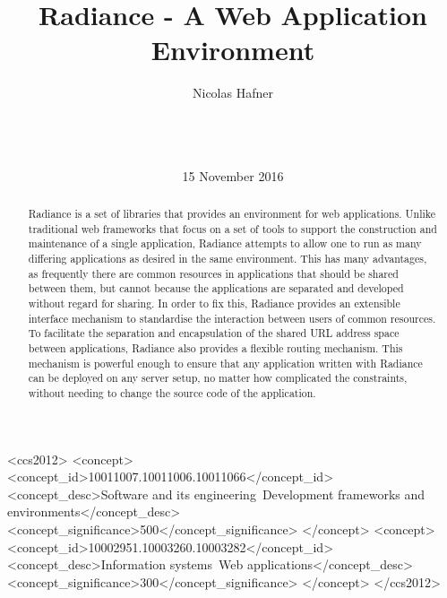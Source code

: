 \documentclass{sig-alternate}
\begin{document}
\doi{}
\isbn{}

\begin{CCSXML}
<ccs2012>
  <concept>
    <concept_id>10011007.10011006.10011066</concept_id>
    <concept_desc>Software and its engineering~Development frameworks and environments</concept_desc>
    <concept_significance>500</concept_significance>
  </concept>
  <concept>
    <concept_id>10002951.10003260.10003282</concept_id>
    <concept_desc>Information systems~Web applications</concept_desc>
    <concept_significance>300</concept_significance>
  </concept>
</ccs2012>
\end{CCSXML}


\title{Radiance - A Web Application Environment}

\author{
\alignauthor
Nicolas Hafner\\
       \\
       \\
       \\
}
\date{15 November 2016}

\maketitle

\begin{abstract}
  Radiance\cite{radiance} is a set of libraries that provides an environment for web applications. Unlike traditional web frameworks that focus on a set of tools to support the construction and maintenance of a single application, Radiance attempts to allow one to run as many differing applications as desired in the same environment. This has many advantages, as frequently there are common resources in applications that should be shared between them, but cannot because the applications are separated and developed without regard for sharing. In order to fix this, Radiance provides an extensible interface mechanism to standardise the interaction between users of common resources. To facilitate the separation and encapsulation of the shared URL address space between applications, Radiance also provides a flexible routing mechanism. This mechanism is powerful enough to ensure that any application written with Radiance can be deployed on any server setup, no matter how complicated the constraints, without needing to change the source code of the application.
\end{abstract}
\end{document}

